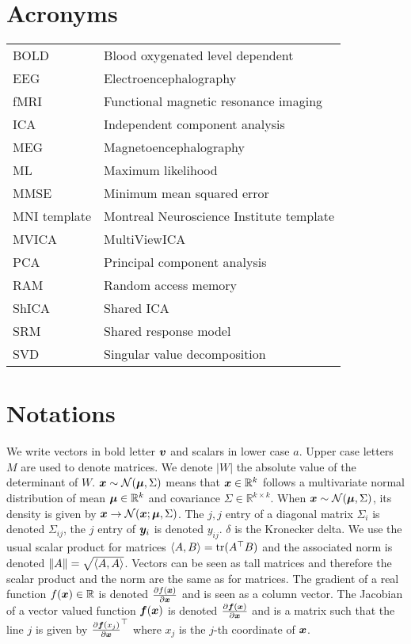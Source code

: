     \chapter*{Acronyms}
    \begin{tabular}{ll}
      BOLD & Blood oxygenated level dependent \\
      EEG & Electroencephalography \\
      fMRI & Functional magnetic resonance imaging \\
        ICA & Independent component analysis \\
      MEG & Magnetoencephalography \\
        ML & Maximum likelihood \\
      MMSE & Minimum mean squared error \\
      MNI template & Montreal Neuroscience Institute template \\
      MVICA & MultiViewICA \\
      PCA & Principal component analysis \\
      RAM & Random access memory \\
      ShICA & Shared ICA \\
      SRM & Shared response model \\
      SVD & Singular value decomposition \\
    \end{tabular}

    \chapter*{Notations}
    We write vectors in bold letter $\boldsymbol{v}$ and scalars in lower case $a$. Upper case letters $M$ are used to denote
    matrices. We denote $|W|$ the absolute value of the determinant of $W$. $\boldsymbol{x} \sim \mathcal{N}(\boldsymbol{\mu}, \Sigma)$ means that $\boldsymbol{x} \in \mathbb{R}^k$ follows a multivariate normal distribution of mean $\boldsymbol{\mu} \in \mathbb{R}^k$ and
    covariance $\Sigma \in \mathbb{R}^{k \times k}$. When $\boldsymbol{x} \sim \mathcal{N}(\boldsymbol{\mu},
    \Sigma)$, its density is given by $\boldsymbol{x} \rightarrow \mathcal{N}(\boldsymbol{x}; \boldsymbol{\mu}, \Sigma)$. The $j, j$ entry of a diagonal matrix $\Sigma_i$ is denoted $\Sigma_{ij}$, the $j$ entry of $\boldsymbol{y}_i$ is denoted $y_{ij}$. $\delta$ is the Kronecker delta.
    We use the usual scalar product for matrices $\langle{ A },{ B}\rangle =
    \mathop{\mathrm{tr}}(A^{\top} B)$ and the associated norm is denoted $\|A\| = \sqrt{\langle{
        A},{ A }\rangle}$. Vectors can be seen as tall matrices and
    therefore the scalar product and the norm are the same as for matrices.
    The gradient of a real function $f(\boldsymbol{x}) \in \mathbb{R}$ is denoted $\frac{ \partial f(\boldsymbol{x})}{\partial \boldsymbol{x}}$
    and is seen as a column vector. The Jacobian of a vector valued
    function $\boldsymbol{f}(\boldsymbol{x})$ is denoted $\frac{ \partial \boldsymbol{f}(\boldsymbol{x})}{\partial \boldsymbol{x}}$ and is a matrix
    such that the line $j$ is given by $\frac{ \partial \boldsymbol{f}(x_j)}{\partial \boldsymbol{x}}^{\top}$ where $x_j$
    is the $j$-th coordinate of $\boldsymbol{x}$.
\endgroup
